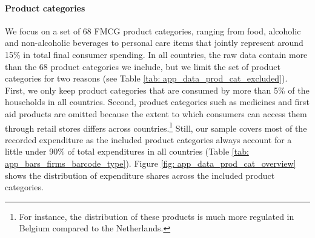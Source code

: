 \paragraph{Product categories}  We focus on a set of 68 FMCG product categories, ranging from food, alcoholic and non-alcoholic beverages to personal care items that jointly represent around 15\% in total final consumer spending. In all countries, the raw data contain more than the 68 product categories we include, but we limit the set of product categories for two reasons (see Table \ref{tab: app_data_prod_cat_excluded}). First, we only keep product categories that are consumed by more than 5\% of the households in all countries. Second, product categories such as medicines and first aid products are omitted because the extent to which consumers can access them through retail stores differs across countries.\footnote{For instance, the distribution of these products is much more regulated in Belgium compared to the Netherlands.} Still, our sample covers most of the recorded expenditure as the included product categories always account for a little under 90\% of total expenditures in all countries (Table \ref{tab: app_bars_firms_barcode_type}). Figure \ref{fig: app_data_prod_cat_overview} shows the distribution of expenditure shares across the included product categories.

